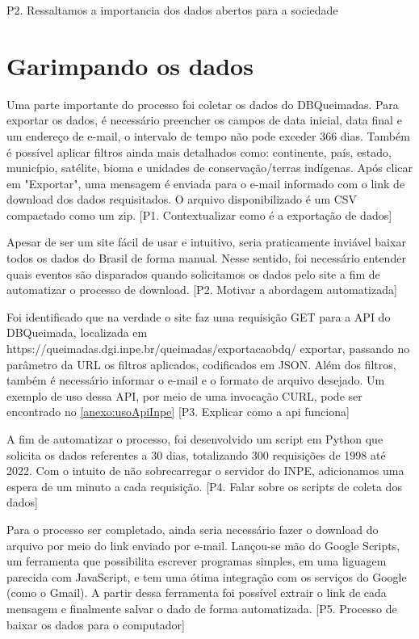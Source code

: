 \documentclass[cic,tc]{iiufrgs}
\begin{document}
P2. Ressaltamos a importancia dos dados abertos para a sociedade \par


\section{Garimpando os dados}

Uma parte importante do processo foi coletar os dados do DBQueimadas. 
Para exportar os dados, é necessário preencher os campos de data inicial,
data final e um endereço de e-mail, o intervalo de tempo não 
pode exceder 366 dias. Também é possível aplicar filtros ainda mais 
detalhados como: continente, país, estado, município, satélite, bioma e 
unidades de conservação/terras indígenas. Após clicar em "Exportar", 
uma mensagem é enviada para o e-mail informado com o link de download 
dos dados requisitados. O arquivo disponibilizado é um CSV compactado 
como um zip. [P1. Contextualizar como é a exportação de dados]\par

Apesar de ser um site fácil de usar e intuitivo, seria praticamente 
inviável baixar todos os dados do Brasil de forma manual. Nesse sentido, 
foi necessário entender quais eventos são disparados quando solicitamos 
os dados pelo site a fim de automatizar o processo de download. 
[P2. Motivar a abordagem automatizada] \par

Foi identificado que na verdade o site faz uma requisição GET para a API do 
DBQueimada, localizada em https://queimadas.dgi.inpe.br/queimadas/exportacaobdq/
exportar, passando no parâmetro da URL os filtros aplicados, codificados em JSON.
Além dos filtros, também é necessário informar o e-mail e o formato de arquivo
desejado. Um exemplo de uso dessa API, por meio de uma invocação CURL, pode 
ser encontrado no \ref{anexo:usoApiInpe} [P3. Explicar como a api funciona]

A fim de automatizar o processo, foi desenvolvido um script em Python que 
solicita os dados referentes a 30 dias, totalizando 300 requisições de 1998 
até 2022. Com 
o intuito de não sobrecarregar o servidor do INPE, adicionamos uma espera de 
um minuto a cada requisição. [P4. Falar sobre os scripts de coleta dos dados] \par

Para o processo ser completado, ainda seria 
necessário fazer o download do arquivo por meio do link enviado por e-mail.
Lançou-se mão do Google Scripts, um ferramenta que possibilita escrever 
programas simples, em uma liguagem parecida com JavaScript, e tem uma ótima
integração com os serviços do Google (como o Gmail). A partir dessa ferramenta
foi possível extrair o link de cada mensagem e finalmente salvar o dado
de forma automatizada. [P5. Processo de baixar os dados para o computador] \par
\end{document}
